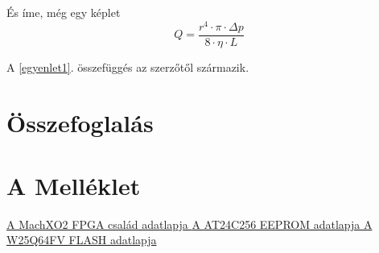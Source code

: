 \documentclass[a4paper,12pt,oneside]{book}
\begin{document}
És íme, még egy képlet
\begin{equation}\label{egyenlet1}
Q=\frac{r^4\cdot \pi \cdot \Delta p}{8\cdot \eta\cdot L}
\end{equation}

A \ref{egyenlet1}. összefüggés az \cite{fpgaadatlap} szerzőtől származik.
\backmatter
\chapter{Összefoglalás}
\appendix

\chapter{A Melléklet}
\fi

\renewcommand{\refname}{Irodalomjegyzék}
\begin{thebibliography}{9}
     \href{https://datasheet.octopart.com/LCMXO2-4000HC-4MG132I-Lattice-Semiconductor-datasheet-12584740.pdf}{A MachXO2 FPGA család adatlapja }
	  \href{https://ww1.microchip.com/downloads/en/DeviceDoc/doc0670.pdf}{A AT24C256 EEPROM adatlapja }
	 \href{https://ww1.microchip.com/downloads/en/DeviceDoc/doc0670.pdf}{A W25Q64FV FLASH adatlapja }
\end{thebibliography}
\end{document}
